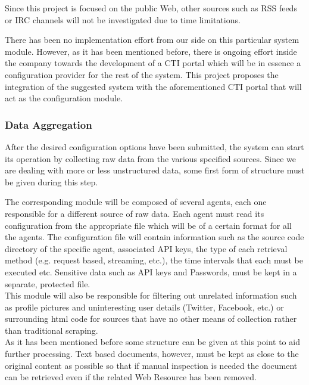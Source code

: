 \documentclass[12pt]{article}
\newcounter{subsubsubsection}[subsubsection]
\begin{document}
Since this project is focused on the public Web, other sources such as RSS feeds or IRC channels will not be investigated due to time limitations.   

\newpage
{}
There has been no implementation effort from our side on this particular system module. However, as it has been mentioned before, there is ongoing effort inside the company towards the development of a CTI portal which will be in essence a configuration provider for the rest of the system. This project proposes the integration of the suggested system with the aforementioned CTI portal that will act as the configuration module. 


\subsubsection{Data Aggregation}

After the desired configuration options have been submitted, the  system can start its operation by collecting raw data from the various specified sources. Since we are dealing with more or less unstructured data, some first form of structure must be given during this step.


The corresponding module will be composed of several agents, each one responsible for a different source of raw data. Each agent must read its configuration from the appropriate file which will be of a certain format for all the agents. The configuration file will contain information such as the source code directory of the specific agent, associated API keys, the type of each retrieval method (e.g. request based, streaming, etc.), the time intervals that each must be executed etc. Sensitive data such as API keys and Passwords, must be kept in a separate, protected file.
\hfill \break \\
This module will also be responsible for filtering out unrelated information such as profile pictures and uninteresting user details (Twitter, Facebook, etc.) or surrounding html code for sources that have no other means of collection rather than traditional scraping.
\hfill \break \\
As it has been mentioned before some structure can be given at this point to aid further processing. Text based documents, however, must be kept as close to the original content as possible so that if manual inspection is needed the document can be retrieved even if the related Web Resource has been removed.
\end{document}
